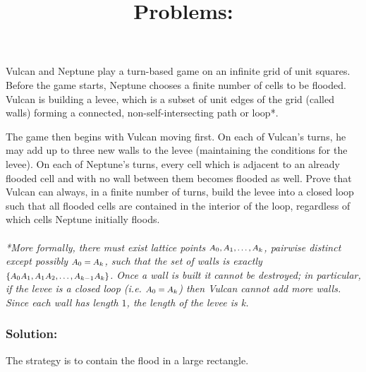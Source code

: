 \documentclass[fontsize=9pt]{scrartcl}
\begin{document}
	\title{ Problems: }
	\author{}
	\date{}
	\maketitle
	\begin{tcolorbox}
		[colback=white!5!white,colframe=purple!75!white,title=\textsf{Problem 1: (USA
		EGMO Team Selection Test 2020)}, opacityback=1] Vulcan and Neptune play a turn-based
		game on an infinite grid of unit squares. Before the game starts, Neptune chooses
		a finite number of cells to be flooded. Vulcan is building a levee, which is
		a subset of unit edges of the grid (called walls) forming a connected, non-self-intersecting
		path or loop*.

		The game then begins with Vulcan moving first. On each of Vulcan’s turns, he
		may add up to three new walls to the levee (maintaining the conditions for
		the levee). On each of Neptune’s turns, every cell which is adjacent to an already
		flooded cell and with no wall between them becomes flooded as well. Prove
		that Vulcan can always, in a finite number of turns, build the levee into a
		closed loop such that all flooded cells are contained in the interior of the
		loop, regardless of which cells Neptune initially floods. ~\\ ~\\ \emph{ *More
		formally, there must exist lattice points $\mbox{\footnotesize
		$A_{0}, A_{1}, \dotsc, A_{k}$}$, pairwise distinct except possibly
		$\mbox{\footnotesize $A_{0} = A_{k}$}$, such that the set of walls is exactly
		$\mbox{\footnotesize $\{A_{0}A_{1}, A_{1}A_{2}, \dotsc , A_{k-1}A_{k}\}$}$.
		Once a wall is built it cannot be destroyed; in particular, if the levee is
		a closed loop (i.e. $\mbox{\footnotesize $A_{0} = A_{k}$}$) then Vulcan cannot
		add more walls. Since each wall has length $1$, the length of the levee is k.}
	\end{tcolorbox}

	\subsubsection*{Solution:}
	The strategy is to contain the flood in a large rectangle.
\end{document}
